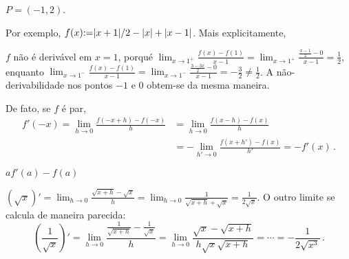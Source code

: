 \begin{Solution}{6.9}
$P=(-1,2)$.
\end{Solution}
\begin{Solution}{6.10}
Por exemplo, $f(x){:=} |x+1|/2-|x|+|x-1|$.
Mais explicitamente,
\begin{center}
\begin{bmlimage}\end{bmlimage}
\end{center}
$f$ não é derivável em $x=1$, porqué
$\lim_{x\to 1^+}\frac{f(x)-f(1)}{x-1}=\lim_{x\to
1^+}\frac{\frac{x-1}{2}-0}{x-1}=\frac12$,
enquanto
$\lim_{x\to 1^-}\frac{f(x)-f(1)}{x-1}=\lim_{x\to
1^-}\frac{\frac{3-3x}{2}-0}{x-1}=-\frac32\neq \frac12$.
A não-derivabilidade nos pontos $-1$ e $0$ obtem-se da mesma maneira.
\end{Solution}
\begin{Solution}{6.11}
De fato, se $f$ é par,
\begin{align*}
f'(-x)=\lim_{h\to 0}\frac{f(-x+h)-f(-x)}{h}
&=\lim_{h\to 0}\frac{f(x-h)-f(x)}{h}\\
&=-\lim_{h'\to 0}\frac{f(x+h')-f(x)}{h'}=-f'(x)\,.
\end{align*}
\end{Solution}
\begin{Solution}{6.12}
$af'(a)-f(a)$
\end{Solution}
\begin{Solution}{6.13}
$(\sqrt{x})'=\lim_{h\to 0}\frac{\sqrt{x+h}-\sqrt{x}}{h}=
\lim_{h\to 0}\frac{1}{\sqrt{x+h}+\sqrt{x}}=\frac{1}{2\sqrt{x}}$.
O outro limite se calcula de maneira parecida:
$$(\frac{1}{\sqrt{x}})'=\lim_{h\to
0}\frac{\frac{1}{\sqrt{x+h}}-\frac{1}{\sqrt{x}}}{h}=
\lim_{h\to
0}\frac{\sqrt{x}-\sqrt{x+h}}{h\sqrt{x}\sqrt{x+h}}=\cdots=-\frac{1}{2\sqrt{x^3}}
\,.
$$
\end{Solution}
